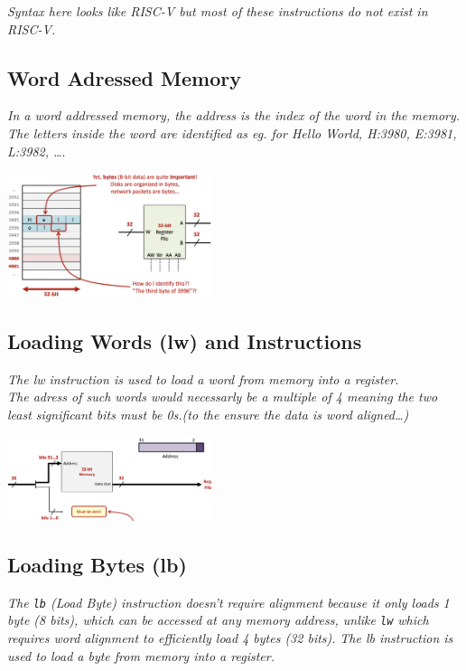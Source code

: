\textit{Syntax here looks like RISC-V but most of these instructions do not exist in RISC-V.}

\subsection{Word Adressed Memory}
\textit{In a word addressed memory, the address is the index of the word in the memory.} \\ 
\textit{The letters inside the word are identified as eg. for Hello World, H:3980, E:3981, L:3982, \dots}.
\begin{center}
    \includegraphics[width=0.45\textwidth]{chapters/chapter1c/images/word_add.png}
\end{center}

\subsection{Loading Words (lw) and Instructions}
\textit{The lw instruction is used to load a word from memory into a register.} \\ 
\textit{The adress of such words would necessarly be a multiple of 4 meaning the two least significant bits must be 0s.(to the ensure the data is word aligned\dots)} \\ 
\begin{center}
    \includegraphics[width=0.45\textwidth]{chapters/chapter1c/images/lw.png}
\end{center}
\subsection{Loading Bytes (lb)}
\textit{The \texttt{lb} (Load Byte) instruction doesn't require alignment because it only loads 1 byte (8 bits), which can be accessed at any memory address, unlike \texttt{lw} which requires word alignment to efficiently load 4 bytes (32 bits).
}\textit{The lb instruction is used to load a byte from memory into a register.} \\ 

